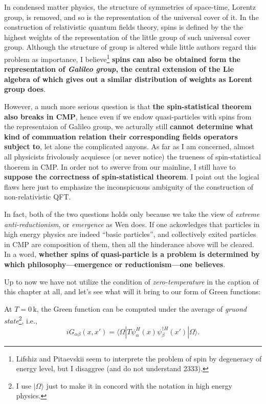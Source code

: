 \documentclass[b5paper,10pt,UTF8]{book}
\numberwithin{equation}{section}
\begin{document}
		\begin{Note}
			In condensed matter physics, the structure of symmetries of space-time, Lorentz group, is removed, and so is the representation of the universal cover of it. In the construction of relativistic quantum fields theory, spins is defined by the the highest weights of the representation of the little group of such universal cover group. Although the structure of group is altered while little authors regard this problem as importance, I believe\footnote{Lifshiz and Pitaevskii seem to interprete the problem of spin by degeneracy of energy level, but I disaggree (and do not understand 2333).} \textbf{spins can also be obtained form the representation of \emph{Galileo group}, the central extension of the Lie algebra of which gives out a similar distribution of weights as Lorent group does}. \par
			However, a much more serious question is that \textbf{the spin-statistical theorem also breaks in CMP}, hence even if we endow quasi-particles with spins from the representaion of Galileo group, we acturally still \textbf{cannot determine what kind of commuation relation their corresponding fields operators subject to}, let alone the complicated anyons. As far as I am concerned, almost all physicists frivolously acquiesce (or never notice) the trueness of spin-statistical thoerem in CMP. In order not to swerve from our mainline, I still have to \textbf{suppose the correctness of spin-statistical theorem}. I point out the logical flaws here just to emphasize the inconspicuous ambiguity of the construction of non-relativistic QFT.\par
			In fact, both of the two questions holds only because we take the view of \emph{extreme anti-reductionism}, or \emph{emergence} as Wen does. If one ackowledges that particles in high energy physics are indeed ``basic particles'', and collectively exited particles in CMP are composition of them, then all the hinderance above will be cleared. In a word, \textbf{whether spins of quasi-particle is a problem is determined by which philosophy---emergence or reductionism---one believes}.
		\end{Note}
		\hfill\par
		\hfill\par
		Up to now we have not utilize the condition of \emph{zero-temperature} in the caption of this chapter at all, and let's see what will it bring to our form of Green functions:
		\begin{Proposition}[($T=0$ Green Function)]
			At $T=0\,\mathrm{k}$, the Green function can be computed under the average of \emph{gruond state}\footnote{I use $|\Omega\rangle$ just to make it in concord with the notation in high energy physics.}, i.e.,
			\begin{equation}
				iG_{\alpha\beta}(x,x')=\langle\Omega|T\psi_\alpha^H(x)\psi_\beta^{\dagger H}(x')|\Omega\rangle.
			\end{equation}
		\end{Proposition}
\end{document}
